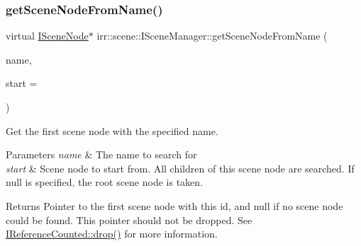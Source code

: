 \subsubsection{\texorpdfstring{get\+Scene\+Node\+From\+Name()}{getSceneNodeFromName()}\hspace{0.1cm}{\footnotesize\ttfamily [2/2]}}
{\footnotesize\ttfamily virtual \hyperlink{classirr_1_1scene_1_1ISceneNode}{I\+Scene\+Node}$\ast$ irr\+::scene\+::\+I\+Scene\+Manager\+::get\+Scene\+Node\+From\+Name (\begin{DoxyParamCaption}\item[{const \hyperlink{namespaceirr_a9395eaea339bcb546b319e9c96bf7410}{c8} $\ast$}]{name,  }\item[{\hyperlink{classirr_1_1scene_1_1ISceneNode}{I\+Scene\+Node} $\ast$}]{start = {} }\end{DoxyParamCaption})\hspace{0.3cm}{\ttfamily [pure virtual]}}



Get the first scene node with the specified name. 


\begin{DoxyParams}{Parameters}
{\em name} & The name to search for \\
\hline
{\em start} & Scene node to start from. All children of this scene node are searched. If null is specified, the root scene node is taken. \\
\hline
\end{DoxyParams}
\begin{DoxyReturn}{Returns}
Pointer to the first scene node with this id, and null if no scene node could be found. This pointer should not be dropped. See \hyperlink{classirr_1_1IReferenceCounted_a03856a09355b89d178090c4a5f738543}{I\+Reference\+Counted\+::drop()} for more information. 
\end{DoxyReturn}
\mbox{\label{classirr_1_1scene_1_1ISceneManager_a5ab8e8f8cc8456a3ea881c75dfe505bb}} 
